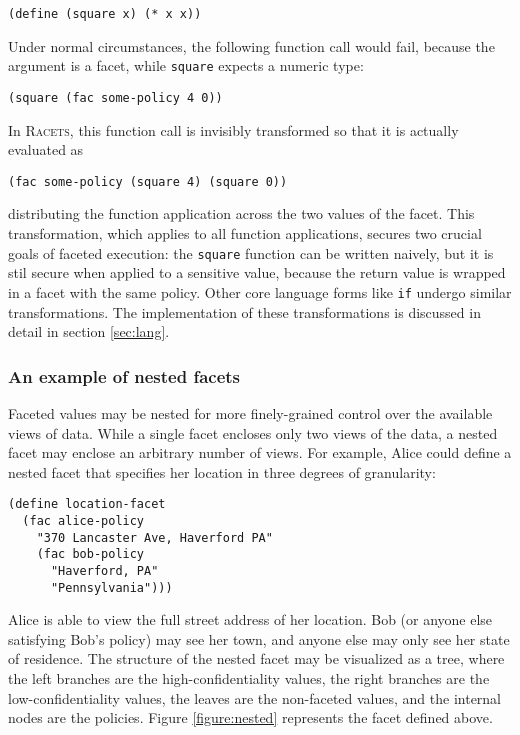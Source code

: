 \documentclass{article}
\begin{document}
\begin{lstlisting}
(define (square x) (* x x))
\end{lstlisting}

Under normal circumstances, the following function call would fail, because the argument is a facet, while \texttt{square} expects a numeric type:

\begin{lstlisting}
(square (fac some-policy 4 0))
\end{lstlisting}

In \textsc{Racets}, this function call is invisibly transformed so that it is actually evaluated as

\begin{lstlisting}
(fac some-policy (square 4) (square 0))
\end{lstlisting}

\noindent distributing the function application across the two values of the facet. This transformation, which applies to all function applications, secures two crucial goals of faceted execution: the \texttt{square} function can be written naively, but it is stil secure when applied to a sensitive value, because the return value is wrapped in a facet with the same policy. Other core language forms like \texttt{if} undergo similar transformations. The implementation of these transformations is discussed in detail in section \ref{sec:lang}.


\subsubsection{An example of nested facets}
Faceted values may be nested for more finely-grained control over the available views of data. While a single facet encloses only two views of the data, a nested facet may enclose an arbitrary number of views. For example, Alice could define a nested facet that specifies her location in three degrees of granularity:

\begin{lstlisting}
(define location-facet
  (fac alice-policy
    "370 Lancaster Ave, Haverford PA"
    (fac bob-policy
      "Haverford, PA"
      "Pennsylvania")))
\end{lstlisting}

Alice is able to view the full street address of her location. Bob (or anyone else satisfying Bob's policy) may see her town, and anyone else may only see her state of residence. The structure of the nested facet may be visualized as a tree, where the left branches are the high-confidentiality values, the right branches are the low-confidentiality values, the leaves are the non-faceted values, and the internal nodes are the policies. Figure \ref{figure:nested} represents the facet defined above.
\end{document}
